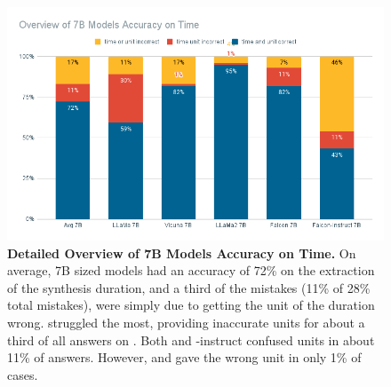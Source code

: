 \begin{figure}[!htb]
    \begin{centering}
        \includegraphics[width=\textwidth]{img/overview_7b_time}
        \caption[7B Models Detailed Time Accuracy]{\textbf{Detailed Overview of 7B Models Accuracy on Time.}
            On average, 7B sized models had an accuracy of 72\% on the extraction of the synthesis duration, and a third of the mistakes (11\% of 28\% total mistakes), were simply due to getting the unit of the duration wrong.
             struggled the most, providing inaccurate units for about a third of all answers on \ttime.
            Both  and -instruct confused units in about 11\% of answers.
            However,  and  gave the wrong unit in only 1\% of cases.
        }
        \label{fig:7b_time}
    \end{centering}
\end{figure}
